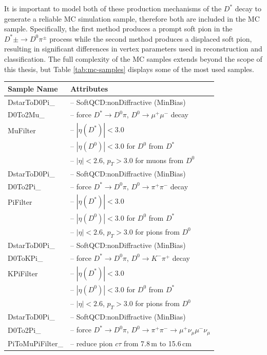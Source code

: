 It is important to model both of these production mechanisms of the $D^*$ decay to generate a reliable MC simulation sample, therefore both are included in the MC sample. Specifically, the first method produces a prompt soft pion in the $D^*\pm \to D^0 \pi^\pm$ process while the second method produces a displaced soft pion, resulting in significant differences in vertex parameters used in reconstruction and classification. The full complexity of the MC samples extends beyond the scope of this thesis, but Table \ref{tab:mc-samples} displays some of the most used samples.

\begin{table}
\centering
\begin{tabular}{|p{3.2cm}|p{12cm}|}
    \hline
    \textbf{Sample Name} & \textbf{Attributes} \\
    \hline
    DstarToD0Pi\_ & -- SoftQCD:nonDiffractive (MinBias) \\
    D0To2Mu\_ & -- force $D^* \to D^0\pi$, $D^0 \to \mu^+\mu^-$ decay \\
    MuFilter & -- $|\eta(D^*)| < 3.0$ \\
    & -- $|\eta(D^0)| < 3.0$ for $D^0$ from $D^*$ \\
    & -- $|\eta| < 2.6$, $p_T > 3.0$ for muons from $D^0$ \\
    \hline
    DstarToD0Pi\_ & -- SoftQCD:nonDiffractive (MinBias) \\
    D0To2Pi\_ & -- force $D^* \to D^0\pi$, $D^0 \to \pi^+\pi^-$ decay \\
    PiFilter & -- $|\eta(D^*)| < 3.0$ \\
    & -- $|\eta(D^0)| < 3.0$ for $D^0$ from $D^*$ \\
    & -- $|\eta| < 2.6$, $p_T > 3.0$ for pions from $D^0$ \\
    \hline
    DstarToD0Pi\_ & -- SoftQCD:nonDiffractive (MinBias) \\
    D0ToKPi\_ & -- force $D^* \to D^0\pi$, $D^0 \to K^-\pi^+$ decay \\
    KPiFilter & -- $|\eta(D^*)| < 3.0$ \\
    & -- $|\eta(D^0)| < 3.0$ for $D^0$ from $D^*$ \\
    & -- $|\eta| < 2.6$, $p_T > 3.0$ for pions from $D^0$ \\
    \hline
    DstarToD0Pi\_ & -- SoftQCD:nonDiffractive (MinBias) \\
    D0To2Pi\_ & -- force $D^* \to D^0\pi$, $D^0 \to \pi^+\pi^- \to \mu^+\nu_\mu\mu^-\nu_\mu$ \\
    PiToMuPiFilter\_ & -- reduce pion $c\tau$ from 7.8\,m to 15.6\,cm \\

\end{tabular}
\end{table}
